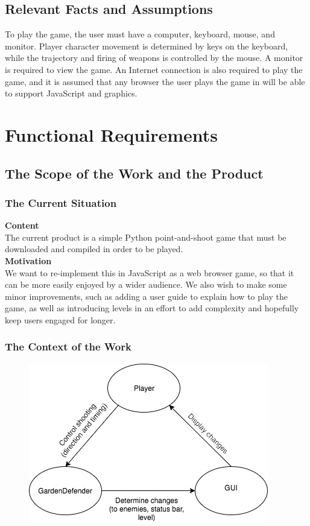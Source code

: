 \documentclass[12pt, titlepage]{article}
\begin{document}
\subsection{Relevant Facts and Assumptions}

To play the game, the user must have a computer, keyboard, mouse, and monitor. Player character movement is determined by keys on the keyboard, while the trajectory and firing of weapons is controlled by the mouse. A monitor is required to view the game. An Internet connection is also required to play the game, and it is assumed that any browser the user plays the game in will be able to support JavaScript and graphics.  

\section{Functional Requirements}

\subsection{The Scope of the Work and the Product}
\subsubsection{The Current Situation}
\textbf{Content} \\
\noindent The current product is a simple Python point-and-shoot game that must be downloaded and compiled in order to be played. \\

\noindent \textbf{Motivation} \\
We want to re-implement this in JavaScript as a web browser game, so that it can be more easily enjoyed by a wider audience. We also wish to make some minor improvements, such as adding a user guide to explain how to play the game, as well as introducing levels in an effort to add complexity and hopefully keep users engaged for longer. 

\subsubsection{The Context of the Work}
\begin{figure}[H]
    \centering
    \includegraphics{context_rough.jpg}
\end{figure}
\end{document}
